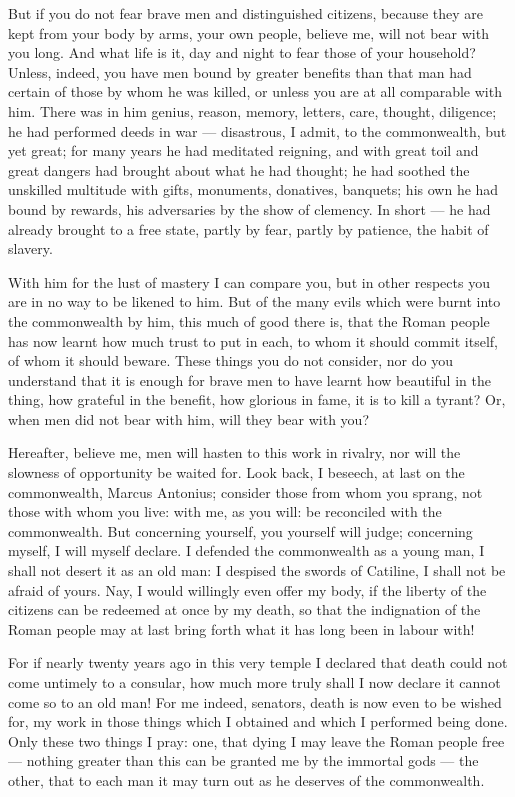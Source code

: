  But if you do not fear brave men and distinguished citizens, because they are kept from your body by arms, your own people, believe me, will not bear with you long. And what life is it, day and night to fear those of your household? Unless, indeed, you have men bound by greater benefits than that man had certain of those by whom he was killed, or unless you are at all comparable with him. There was in him genius, reason, memory, letters, care, thought, diligence; he had performed deeds in war --- disastrous, I admit, to the commonwealth, but yet great; for many years he had meditated reigning, and with great toil and great dangers had brought about what he had thought; he had soothed the unskilled multitude with gifts, monuments, donatives, banquets; his own he had bound by rewards, his adversaries by the show of clemency. In short --- he had already brought to a free state, partly by fear, partly by patience, the habit of slavery.

 With him for the lust of mastery I can compare you, but in other respects you are in no way to be likened to him. But of the many evils which were burnt into the commonwealth by him, this much of good there is, that the Roman people has now learnt how much trust to put in each, to whom it should commit itself, of whom it should beware. These things you do not consider, nor do you understand that it is enough for brave men to have learnt how beautiful in the thing, how grateful in the benefit, how glorious in fame, it is to kill a tyrant? Or, when men did not bear with him, will they bear with you?

 Hereafter, believe me, men will hasten to this work in rivalry, nor will the slowness of opportunity be waited for. Look back, I beseech, at last on the commonwealth, Marcus Antonius; consider those from whom you sprang, not those with whom you live: with me, as you will: be reconciled with the commonwealth. But concerning yourself, you yourself will judge; concerning myself, I will myself declare. I defended the commonwealth as a young man, I shall not desert it as an old man: I despised the swords of Catiline, I shall not be afraid of yours. Nay, I would willingly even offer my body, if the liberty of the citizens can be redeemed at once by my death, so that the indignation of the Roman people may at last bring forth what it has long been in labour with!

 For if nearly twenty years ago in this very temple I declared that death could not come untimely to a consular, how much more truly shall I now declare it cannot come so to an old man! For me indeed, senators, death is now even to be wished for, my work in those things which I obtained and which I performed being done. Only these two things I pray: one, that dying I may leave the Roman people free --- nothing greater than this can be granted me by the immortal gods --- the other, that to each man it may turn out as he deserves of the commonwealth.
